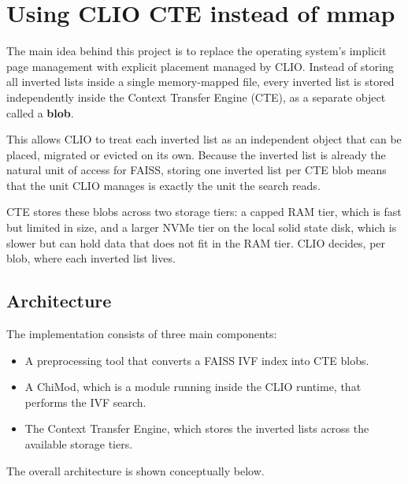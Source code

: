 \documentclass[11pt]{article}
\begin{document}
\newpage

\section{Using CLIO CTE instead of mmap}

The main idea behind this project is to replace the operating
system's implicit page management with explicit placement managed by
CLIO. Instead of storing all inverted lists inside a single
memory-mapped file, every inverted list is stored independently
inside the Context Transfer Engine (CTE), as a separate object called
a \textbf{blob}.

This allows CLIO to treat each inverted list as an independent object
that can be placed, migrated or evicted on its own. Because the
inverted list is already the natural unit of access for FAISS,
storing one inverted list per CTE blob means that the unit CLIO
manages is exactly the unit the search reads.

CTE stores these blobs across two storage tiers: a capped RAM tier,
which is fast but limited in size, and a larger NVMe tier on the
local solid state disk, which is slower but can hold data that does
not fit in the RAM tier. CLIO decides, per blob, where each inverted
list lives.

\subsection{Architecture}

The implementation consists of three main components:

\begin{itemize}
\item A preprocessing tool that converts a FAISS IVF index into CTE blobs.
\item A ChiMod, which is a module running inside the CLIO runtime, that
performs the IVF search.
\item The Context Transfer Engine, which stores the inverted lists
across the available storage tiers.
\end{itemize}

The overall architecture is shown conceptually below.
\end{document}
